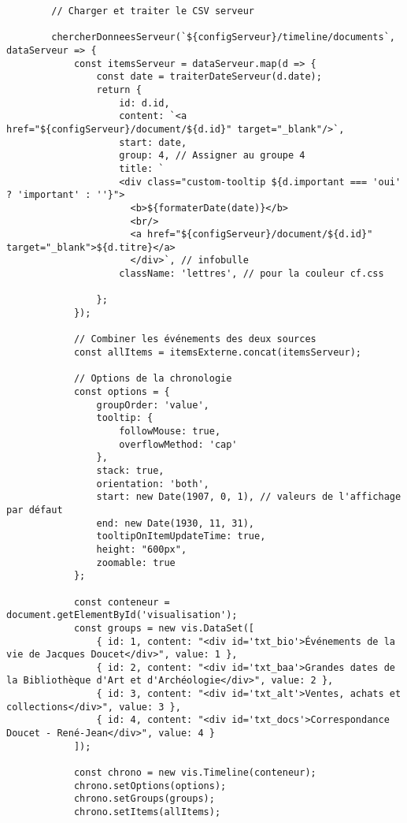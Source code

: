\begin{verbatim}
        // Charger et traiter le CSV serveur
       
        chercherDonneesServeur(`${configServeur}/timeline/documents`, dataServeur => {
            const itemsServeur = dataServeur.map(d => {
                const date = traiterDateServeur(d.date);
                return {
                    id: d.id,
                    content: `<a href="${configServeur}/document/${d.id}" target="_blank"/>`,
                    start: date,
                    group: 4, // Assigner au groupe 4
                    title: `
                    <div class="custom-tooltip ${d.important === 'oui' ? 'important' : ''}">
                      <b>${formaterDate(date)}</b>
                      <br/>
                      <a href="${configServeur}/document/${d.id}" target="_blank">${d.titre}</a>
                      </div>`, // infobulle                     
                    className: 'lettres', // pour la couleur cf.css
                    
                };
            });

            // Combiner les événements des deux sources
            const allItems = itemsExterne.concat(itemsServeur);

            // Options de la chronologie
            const options = {
                groupOrder: 'value',
                tooltip: {
                    followMouse: true,
                    overflowMethod: 'cap'
                },
                stack: true,
                orientation: 'both',
                start: new Date(1907, 0, 1), // valeurs de l'affichage par défaut
                end: new Date(1930, 11, 31),
                tooltipOnItemUpdateTime: true,
                height: "600px",                
                zoomable: true
            };

            const conteneur = document.getElementById('visualisation');
            const groups = new vis.DataSet([                
                { id: 1, content: "<div id='txt_bio'>Événements de la vie de Jacques Doucet</div>", value: 1 },
                { id: 2, content: "<div id='txt_baa'>Grandes dates de la Bibliothèque d'Art et d'Archéologie</div>", value: 2 },
                { id: 3, content: "<div id='txt_alt'>Ventes, achats et collections</div>", value: 3 },
                { id: 4, content: "<div id='txt_docs'>Correspondance Doucet - René-Jean</div>", value: 4 }                             
            ]);

            const chrono = new vis.Timeline(conteneur);
            chrono.setOptions(options);
            chrono.setGroups(groups);
            chrono.setItems(allItems);


\end{verbatim}
